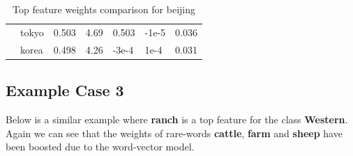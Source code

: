 \begin{table}[htbp]
\begin{tabular}{lllllll}
\multicolumn{1}{l|}{} & \multicolumn{1}{l|}{tokyo} & \multicolumn{1}{l|}{0.503} & \multicolumn{1}{l|}{4.69} & \multicolumn{1}{l|}{0.503} & \multicolumn{1}{l|}{-1e-5} & 0.036 \\
\multicolumn{1}{l|}{\textbf{}} & \multicolumn{1}{l|}{korea} & \multicolumn{1}{l|}{0.498} & \multicolumn{1}{l|}{4.26} & \multicolumn{1}{l|}{-3e-4} & \multicolumn{1}{l|}{1e-4} & 0.031
\end{tabular}
\caption{\label{tab:widgets}Top feature weights comparison for beijing}
\end{table}


\subsection{Example Case 3}

Below is a similar example where \textbf{ranch} is a top feature for the class \textbf{Western}. Again we can see that the weights of rare-words \textbf{cattle}, \textbf{farm} and \textbf{sheep} have been boosted due to the word-vector model.

